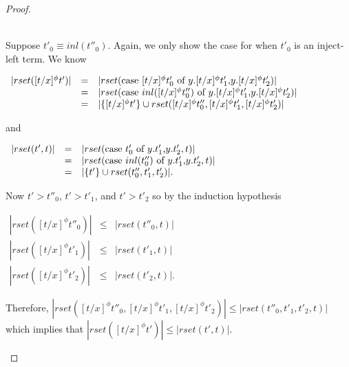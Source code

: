 \begin{proof}
\begin{itemize}
  \ \\
  Suppose $t'_0 \equiv inl(t''_0)$.  Again, we only show the case for when $t'_0$ is an inject-left term.
  We know 
  \begin{center}
    \begin{math}
      \begin{array}{lll}
        |rset([t/x]^\phi t')| & = & |rset(\mbox{case}\ [t/x]^\phi t'_0\ \text{of}\ y\text{.}[t/x]^\phi t'_1\text{,}y\text{.}[t/x]^\phi t'_2)|\\
        & = & |rset(\mbox{case}\ inl([t/x]^\phi t''_0)\ \text{of}\ y\text{.}[t/x]^\phi t'_1\text{,}y\text{.}[t/x]^\phi t'_2)|\\
        & = & |\{[t/x]^\phi t'\} \cup rset([t/x]^\phi t''_0, [t/x]^\phi t'_1, [t/x]^\phi t'_2)|
      \end{array}
    \end{math}
  \end{center}
  and
  \begin{center}
    \begin{math}
      \begin{array}{lll}
        |rset(t',t)| & = & |rset(\mbox{case}\ t'_0\ \text{of}\ y\text{.}t'_1\text{,}y\text{.}t'_2,t)|\\
        & = & |rset(\mbox{case}\ inl(t''_0)\ \text{of}\ y\text{.}t'_1\text{,}y\text{.}t'_2,t)|\\
        & = & |\{t'\} \cup rset(t''_0, t'_1,t'_2)|.
      \end{array}
    \end{math}
  \end{center}
  Now $t' > t''_0$, $t' > t'_1$, and $t' > t'_2$ so by the induction hypothesis
  \begin{center}
    \begin{math}
      \begin{array}{lll}
        |rset([t/x]^\phi t''_0)| & \leq & |rset(t''_0,t)|\\
        |rset([t/x]^\phi t'_1)|  & \leq & |rset(t'_1,t)|\\
        |rset([t/x]^\phi t'_2)|  & \leq & |rset(t'_2,t)|.
      \end{array}
    \end{math}
  \end{center}
  Therefore, $|rset([t/x]^\phi t''_0, [t/x]^\phi t'_1, [t/x]^\phi t'_2)| \leq |rset(t''_0, t'_1, t'_2, t)|$
  which implies that $|rset([t/x]^\phi t')| \leq |rset(t',t)|$.


\end{itemize}
\end{proof}

